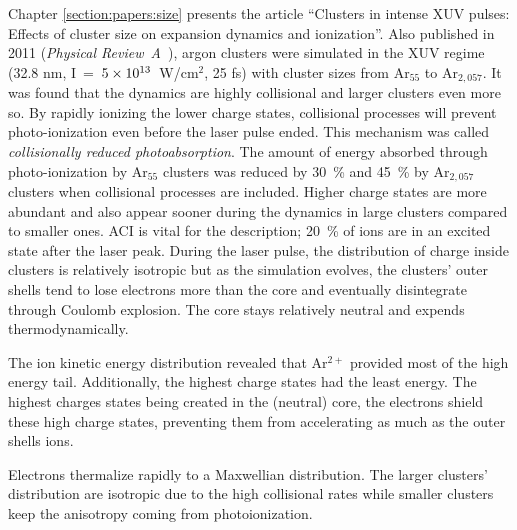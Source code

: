 Chapter \ref{section:papers:size} presents the article ``Clusters in
intense XUV pulses: Effects of cluster size on expansion dynamics and
ionization''. Also published in 2011 (\textit{Physical Review~A}~\cite{Ackad2011b}),
argon clusters were simulated in the XUV regime (32.8 nm,
I~=~$\ten{5}{13}$~W/cm$^{2}$, 25 fs) with cluster sizes from Ar$_{55}$ to
Ar$_{2,057}$. It was found that the dynamics are highly collisional and
larger clusters even more so. By rapidly ionizing the lower charge states,
collisional processes will prevent photo-ionization even before the laser pulse
ended. This mechanism was called \textit{collisionally reduced photoabsorption}.
The amount of energy absorbed through photo-ionization by Ar$_{55}$ clusters was
reduced by 30~\% and 45~\% by Ar$_{2,057}$ clusters when collisional processes
are included.
Higher charge states are more abundant and also appear sooner during the
dynamics in large clusters compared to smaller ones. ACI is vital for the
description; 20~\% of ions are in an excited state after the laser peak.
During the laser pulse, the distribution of charge inside clusters is
relatively isotropic but as the simulation evolves, the clusters' outer shells tend to
lose electrons more than the core and eventually disintegrate through Coulomb
explosion.
The core stays relatively neutral and expends thermodynamically.

The ion kinetic energy distribution revealed that Ar$^{2+}$  provided most of
the high energy tail. Additionally, the highest charge states had the least
energy. The highest charges states being created in the (neutral) core, the
electrons shield these high charge states, preventing them from accelerating
as much as the outer shells ions.

Electrons thermalize rapidly to a Maxwellian distribution. The larger clusters'
distribution are isotropic due to the high collisional rates while smaller
clusters keep the anisotropy coming from photoionization.





